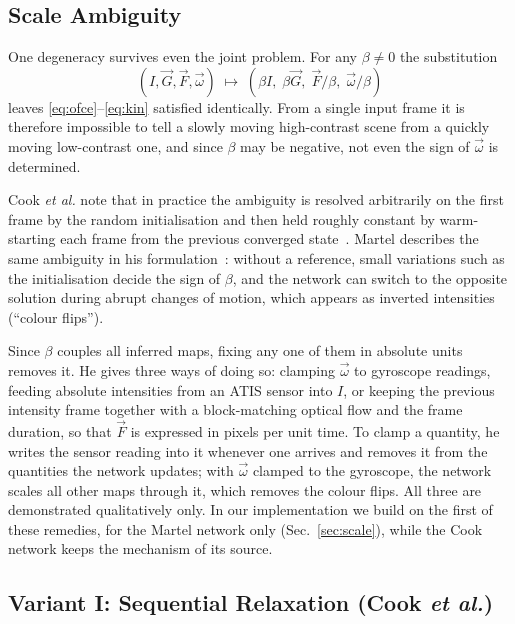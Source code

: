 \documentclass[journal]{IEEEtran}
\newcommand{\Imap}{I}
\newcommand{\Gmap}{\vec{G}}
\newcommand{\Fmap}{\vec{F}}
\newcommand{\wvec}{\vec{\omega}}
\begin{document}
\subsection{Scale Ambiguity}
\label{sec:beta}
One degeneracy survives even the joint problem. For any $\beta\neq 0$ the substitution
\begin{equation}
(\Imap,\Gmap,\Fmap,\wvec) \;\longmapsto\;
 (\beta\Imap,\;\beta\Gmap,\;\Fmap/\beta,\;\wvec/\beta)
\label{eq:beta}
\end{equation}
leaves \eqref{eq:ofce}--\eqref{eq:kin} satisfied identically. From a single input frame it is therefore impossible to tell a slowly moving high-contrast scene from a quickly moving low-contrast one, and since $\beta$ may be negative, not even the sign of $\wvec$ is determined. 

Cook \emph{et al.} note that in practice the ambiguity is resolved arbitrarily on the first frame by the random initialisation and then held roughly constant by warm-starting each frame from the previous converged state~\cite{cook2011}. Martel describes the same ambiguity in his formulation~\cite{martel2019thesis}: without a reference, small variations such as the initialisation decide the sign of $\beta$, and the network can switch to the opposite solution during abrupt changes of motion, which appears as inverted intensities (``colour flips''). 

Since $\beta$ couples all inferred maps, fixing any one of them in absolute units removes it. He gives three ways of doing so: clamping $\wvec$ to gyroscope readings, feeding absolute intensities from an ATIS sensor into $\Imap$, or keeping the previous intensity frame together with a block-matching optical flow and the frame duration, so that $\Fmap$ is expressed in pixels per unit time. To clamp a quantity, he writes the sensor reading into it whenever one arrives and removes it from the quantities the network updates; with $\wvec$ clamped to the gyroscope, the network scales all other maps through it, which removes the colour flips. All three are demonstrated qualitatively only. In our implementation we build on the first of these remedies, for the Martel network only (Sec.~\ref{sec:scale}), while the Cook network keeps the mechanism of its source. 

\subsection{Variant I: Sequential Relaxation (Cook \emph{et al.})}
\label{sec:cook}
\end{document}

